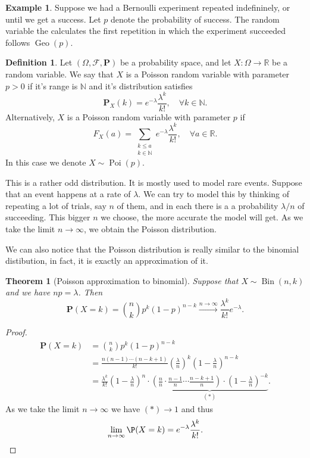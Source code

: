 \documentclass[11pt,a4paper]{article}
\theoremstyle{definition}
\newtheorem{definition}{Definition}[section]
\newtheorem{example}{Example}[section]
\theoremstyle{plain}
\newtheorem{theorem}{Theorem}[section]
\DeclareMathOperator{\Bin}{Bin}
\DeclareMathOperator{\Geo}{Geo}
\DeclareMathOperator{\Poi}{Poi}
\newcommand{\N}{\mathbb{N}}
\newcommand{\R}{\mathbb{R}}
\newcommand{\Prob}{\mathbf{P}}
\begin{document}
  \begin{example}
    Suppose we had a Bernoulli experiment repeated indefininely, or until
    we get a success. Let $p$ denote the probability of success.
    The random variable the calculates the first repetition in which the
    experiment succeeded follows $\Geo(p)$.
  \end{example}

  \begin{definition}
    Let $(\Omega ,\mathcal F, \Prob)$ be a probability space,
    and let $X \colon \Omega \to \R$ be a random variable.
    We say that $X$ is a Poisson random variable with parameter
    $p > 0$ if it's range is $\N$ and it's distribution satisfies
    \[
      \Prob_X(k) = e^{-\lambda} \frac{\lambda^k}{k!}, \quad 
      \forall k \in \N.
    \]
    Alternatively, $X$ is a Poisson random variable with parameter
    $p$ if
    \[
      F_X(a) = \sum_{\substack{k \le a \\ k \in \N}}
      e^{-\lambda} \frac{\lambda^k}{k!}, \quad \forall a \in \R.
    \]
    In this case we denote $X \sim \Poi(p)$.
  \end{definition}
  
  This is a rather odd distribution. It is mostly used to model rare events.
  Suppose that an event happens at a rate of $\lambda$.
  We can try to model this by thinking of repeating a lot of trials,
  say $n$ of them, and in each there is a a probability $\lambda / n$ of 
  succeeding. This bigger $n$ we choose, the more accurate the model will get.
  As we take the limit $n \to \infty$, we obtain the Poisson distribution.
  
  We can also notice that the Poisson distribution is really similar to
  the binomial distibution, in fact, it is exactly an approximation of it.

  \begin{theorem}[Poisson approximation to binomial]
    Suppose that $X \sim \Bin(n,k)$ and we have
    $np = \lambda$. Then
    \[
      \Prob(X = k) = 
      \binom{n}{k} p^{k} (1-p)^{n-k} \xrightarrow{n\to\infty}
      \frac{\lambda^{k}}{k!} e^{-\lambda}.
    \]
  \end{theorem}
  \begin{proof}
    \begin{align*}
      \mathbf {P}(X = k) &= 
      {\binom{n}{k}}p^{k}(1 - p)^{n - k} \\ &= 
      {\frac{n(n - 1) \cdots (n - k + 1)}{k!}} 
      \left(\frac{\lambda}{n}\right)^k
      \left(1 - {\frac{\lambda}{n}}\right)^{n-k} \\ &= 
      \frac{\lambda^{k}}{k!} \left(1-{\frac{\lambda}{n}}\right)^{n} \cdot
      \underbrace{
      \left( {\frac{n}{n}} \cdot 
      {\frac{n - 1}{n}} \cdots {\frac{n - k + 1}{n}} \right) \cdot 
      \left(1 - {\frac{\lambda}{n}}\right)^{-k}}_{(*)}.
    \end{align*}
    As we take the limit $n \to \infty$ we have $(*) \to 1$ and thus
    \[
      \lim_{n\to\infty}\P(X=k)=e^{-\lambda}{\frac{\lambda^{k}}{k!}}.
    \]
  \end{proof}
\end{document}
